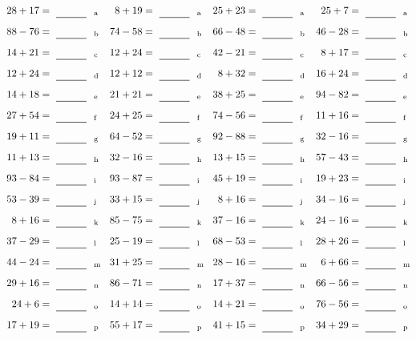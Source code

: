 \documentclass
[
  draft    = true,
  fontsize = 11pt,
  parskip  = half-
]
{scrartcl}
\begin{document}
\clearpage
\begin{align*}
    \pline{28+17}&=\rline{a}
  & \pline{8+19}&=\rline{a}
  & \pline{25+23}&=\rline{a}
  & \pline{25+7}&=\rline{a} \\[1ex]
    \pline{88-76}&=\rline{b}
  & \pline{74-58}&=\rline{b}
  & \pline{66-48}&=\rline{b}
  & \pline{46-28}&=\rline{b} \\[1ex]
    \pline{14+21}&=\rline{c}
  & \pline{12+24}&=\rline{c}
  & \pline{42-21}&=\rline{c}
  & \pline{8+17}&=\rline{c} \\[1ex]
    \pline{12+24}&=\rline{d}
  & \pline{12+12}&=\rline{d}
  & \pline{8+32}&=\rline{d}
  & \pline{16+24}&=\rline{d} \\[1ex]
    \pline{14+18}&=\rline{e}
  & \pline{21+21}&=\rline{e}
  & \pline{38+25}&=\rline{e}
  & \pline{94-82}&=\rline{e} \\[1ex]
    \pline{27+54}&=\rline{f}
  & \pline{24+25}&=\rline{f}
  & \pline{74-56}&=\rline{f}
  & \pline{11+16}&=\rline{f} \\[1ex]
    \pline{19+11}&=\rline{g}
  & \pline{64-52}&=\rline{g}
  & \pline{92-88}&=\rline{g}
  & \pline{32-16}&=\rline{g} \\[1ex]
    \pline{11+13}&=\rline{h}
  & \pline{32-16}&=\rline{h}
  & \pline{13+15}&=\rline{h}
  & \pline{57-43}&=\rline{h} \\[1ex]
    \pline{93-84}&=\rline{i}
  & \pline{93-87}&=\rline{i}
  & \pline{45+19}&=\rline{i}
  & \pline{19+23}&=\rline{i} \\[1ex]
    \pline{53-39}&=\rline{j}
  & \pline{33+15}&=\rline{j}
  & \pline{8+16}&=\rline{j}
  & \pline{34-16}&=\rline{j} \\[1ex]
    \pline{8+16}&=\rline{k}
  & \pline{85-75}&=\rline{k}
  & \pline{37-16}&=\rline{k}
  & \pline{24-16}&=\rline{k} \\[1ex]
    \pline{37-29}&=\rline{l}
  & \pline{25-19}&=\rline{l}
  & \pline{68-53}&=\rline{l}
  & \pline{28+26}&=\rline{l} \\[1ex]
    \pline{44-24}&=\rline{m}
  & \pline{31+25}&=\rline{m}
  & \pline{28-16}&=\rline{m}
  & \pline{6+66}&=\rline{m} \\[1ex]
    \pline{29+16}&=\rline{n}
  & \pline{86-71}&=\rline{n}
  & \pline{17+37}&=\rline{n}
  & \pline{66-56}&=\rline{n} \\[1ex]
    \pline{24+6}&=\rline{o}
  & \pline{14+14}&=\rline{o}
  & \pline{14+21}&=\rline{o}
  & \pline{76-56}&=\rline{o} \\[1ex]
    \pline{17+19}&=\rline{p}
  & \pline{55+17}&=\rline{p}
  & \pline{41+15}&=\rline{p}
  & \pline{34+29}&=\rline{p}
\end{align*}
\end{document}
